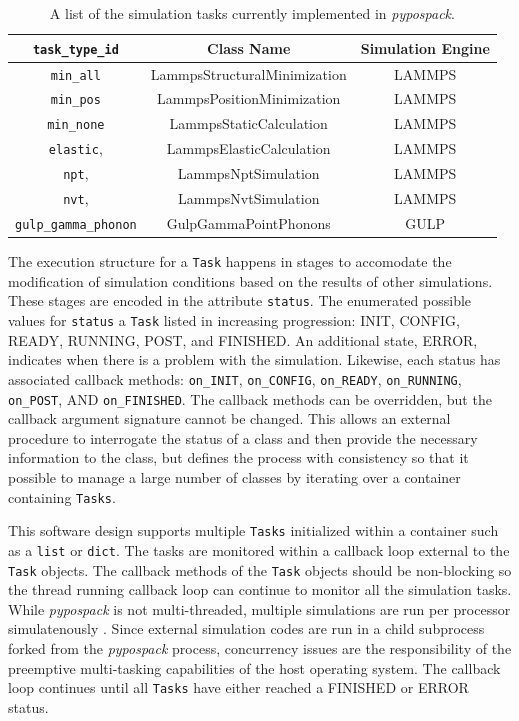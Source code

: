 \begin{table}[ht]
	\centering
	\caption{A list of the simulation tasks currently implemented in \emph{pypospack}.}
	\label{tbl:pypospack_tasks}
	\begin{tabular}{ccc}
		\hline
		\verb|task_type_id|
		& Class Name
		& Simulation Engine \\
		\hline
    \verb|min_all|
		& LammpsStructuralMinimization
		& LAMMPS
		\\
		\verb|min_pos|
		& LammpsPositionMinimization
    & LAMMPS
		\\
		\verb|min_none|
		& LammpsStaticCalculation
    & LAMMPS
		\\
		\verb|elastic|,
		& LammpsElasticCalculation
		& LAMMPS
		\\
    \verb|npt|,
		& LammpsNptSimulation
		& LAMMPS
		\\
		\verb|nvt|,
		& LammpsNvtSimulation
		& LAMMPS
		\\
    \verb|gulp_gamma_phonon|
		& GulpGammaPointPhonons
		& GULP
		\\
		\hline
	\end{tabular}
\end{table}

The execution structure for a \verb|Task| happens in stages to accomodate the modification of simulation conditions based on the results of other simulations.  These stages are encoded in the attribute \verb|status|.  The enumerated possible values for \verb|status| a \verb|Task| listed in increasing progression: INIT, CONFIG, READY, RUNNING, POST, and FINISHED.  An additional state, ERROR, indicates when there is a problem with the simulation.  Likewise, each status has associated callback methods: \verb|on_INIT|, \verb|on_CONFIG|, \verb|on_READY|, \verb|on_RUNNING|, \verb|on_POST|, AND \verb|on_FINISHED|.  The callback methods can be overridden, but the callback argument signature cannot be changed.  This allows an external procedure to interrogate the status of a class and then provide the necessary information to the class, but defines the process with consistency so that it possible to manage a large number of classes by iterating over a container containing \verb|Tasks|.

This software design supports multiple \verb|Tasks| initialized within a container such as a \verb|list| or \verb|dict|.  The tasks are monitored within a callback loop external to the \verb|Task| objects.  The callback methods of the \verb|Task| objects should be non-blocking so the thread running callback loop can continue to monitor all the simulation tasks.  While \emph{pypospack} is not multi-threaded, multiple simulations are run per processor simulatenously .  Since external simulation codes are run in a child subprocess forked from the \emph{pypospack} process, concurrency issues are the responsibility of the preemptive multi-tasking capabilities of the host operating system.  The callback loop continues until all \verb|Tasks| have either reached a FINISHED or ERROR status.

